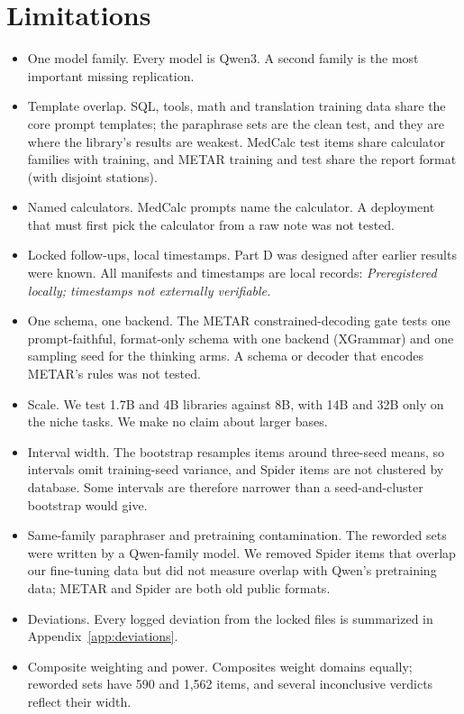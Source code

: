 \documentclass[11pt]{article}
\begin{document}
\section{Limitations}
\begin{itemize}
\item One model family. Every model is Qwen3. A second family is the most important missing replication.
\item Template overlap. SQL, tools, math and translation training data share the core prompt templates; the
  paraphrase sets are the clean test, and they are where the library's results are weakest. MedCalc test items share
  calculator families with training, and METAR training and test share the report format (with disjoint stations).
\item Named calculators. MedCalc prompts name the calculator. A deployment that must first pick the
  calculator from a raw note was not tested.
\item Locked follow-ups, local timestamps. Part D was designed after earlier results were known. All
  manifests and timestamps are local records: \emph{Preregistered locally; timestamps not externally verifiable.}
\item One schema, one backend. The METAR constrained-decoding gate tests one prompt-faithful, format-only schema
  with one backend (XGrammar) and one sampling seed for the thinking arms. A schema or decoder that encodes METAR's
  rules was not tested.
\item Scale. We test 1.7B and 4B libraries against 8B, with 14B and 32B only on the niche tasks. We make no
  claim about larger bases.
\item Interval width. The bootstrap resamples items around three-seed means, so intervals omit training-seed
  variance, and Spider items are not clustered by database. Some intervals are therefore narrower than a
  seed-and-cluster bootstrap would give.
\item Same-family paraphraser and pretraining contamination. The reworded sets were written by a Qwen-family model.
  We removed Spider items that overlap our fine-tuning data but did not measure overlap with Qwen's pretraining data;
  METAR and Spider are both old public formats.
\item Deviations. Every logged deviation from the locked files is summarized in Appendix~\ref{app:deviations}.
\item Composite weighting and power. Composites weight domains equally; reworded sets have 590 and 1,562
  items, and several inconclusive verdicts reflect their width.
\end{itemize}
\end{document}
